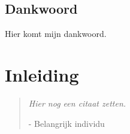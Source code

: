 \documentclass[dutch,12pt,oneside,a4paper]{book}
\newcommand{\phantomsection}{}
\begin{document}


\cleardoublepage
\section*{Dankwoord}

Hier komt mijn dankwoord. 

\newpage
\tableofcontents

\newpage
\mainmatter
\chapter{Inleiding}
\label{inleiding:chap}
\begin{quote}
{{\small\it Hier nog een citaat zetten.}}

{{\small\sc - Belangrijk individu}}
\end{quote}
\medskip




%



\cleardoublepage{}\phantomsection{}



\backmatter
{}



\listoffigures
{}
\listoftables
\end{document}
